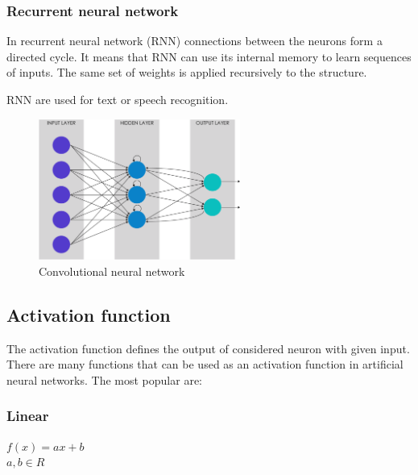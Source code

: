 \documentclass[journal, a4paper]{IEEEtran}
\begin{document}
\subsubsection{Recurrent neural network}
In recurrent neural network (RNN) connections between the neurons form a directed cycle. It means that RNN can use its internal memory to learn  sequences of inputs. The same set of weights is applied recursively to the structure.
\par RNN are used for text or speech recognition.
\begin{figure}[H]
\centering
\includegraphics[width=250px]{pictures/rnn.png}
\caption{Convolutional neural network}
\end{figure}

\subsection{Activation function}
The activation function defines the output of considered neuron with given input. There are many functions that can be used as an activation function in artificial neural networks. The most popular are:
\subsubsection{Linear}
\begin{center}
$ f(x)=ax + b $ \\ $ a,b \in R $ \\~\\
\end{center}
\end{document}
